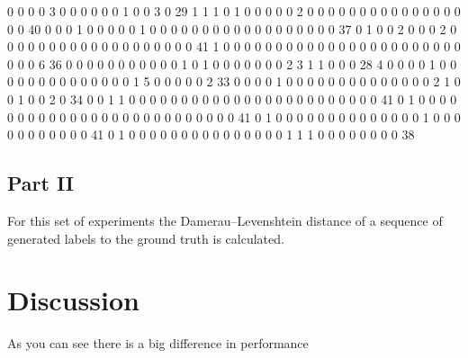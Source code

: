      0     0     0     0     3     0     0     0     0     0     0     1     0     0     3     0    29     1     1     1     0     1     0     0     0     0     0     2
     0     0     0     0     0     0     0     0     0     0     0     0     0     0     0     0     0    40     0     0     0     1     0     0     0     0     0     1
     0     0     0     0     0     0     0     0     0     0     0     0     0     0     0     0     0     0    37     0     1     0     0     2     0     0     0     2
     0     0     0     0     0     0     0     0     0     0     0     0     0     0     0     0     0     0     0    41     1     0     0     0     0     0     0     0
     0     0     0     0     0     0     0     0     0     0     0     0     0     0     0     0     0     0     0     6    36     0     0     0     0     0     0     0
     0     0     0     0     1     0     1     0     0     0     0     0     0     0     2     3     1     1     0     0     0    28     4     0     0     0     0     1
     0     0     0     0     0     0     0     0     0     0     0     0     0     0     1     5     0     0     0     0     0     2    33     0     0     0     0     1
     0     0     0     0     0     0     0     0     0     0     0     0     0     0     2     1     0     0     1     0     0     2     0    34     0     0     1     1
     0     0     0     0     0     0     0     0     0     0     0     0     0     0     0     0     0     0     0     0     0     0     0     0    41     0     1     0
     0     0     0     0     0     0     0     0     0     0     0     0     0     0     0     0     0     0     0     0     0     0     0     0     0    41     0     1
     0     0     0     0     0     0     0     0     0     0     0     0     0     0     1     0     0     0     0     0     0     0     0     0     0     0    41     0
     1     0     0     0     0     0     0     0     0     0     0     0     0     0     0     0     1     1     1     0     0     0     0     0     0     0     0    38

\subsection{Part II}

For this set of experiments the Damerau–Levenshtein distance of a sequence of generated labels to the ground truth is calculated.


\section{Discussion}
As you can see there is a big difference in performance 



